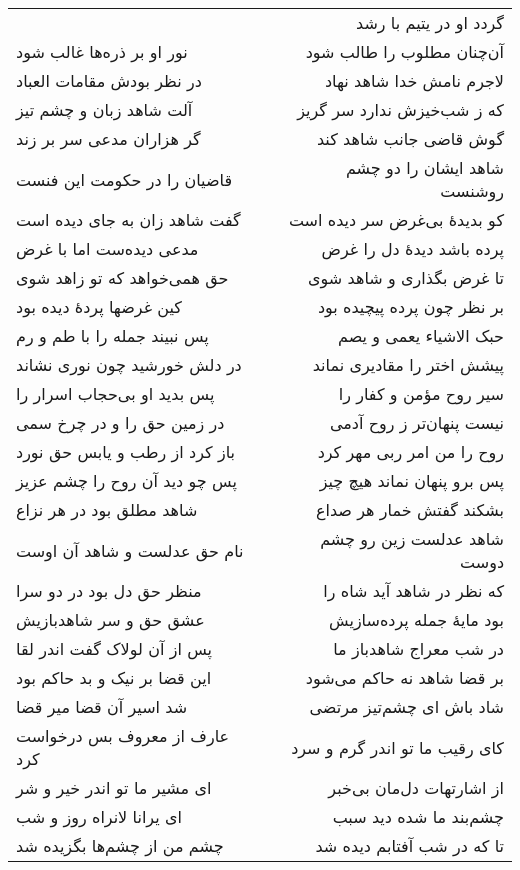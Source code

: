 \begin{center}
\begin{longtable}{l p{0.5cm} r}
&&
گردد او در یتیم با رشد
\\
نور او بر ذره‌ها غالب شود
&&
آن‌چنان مطلوب را طالب شود
\\
در نظر بودش مقامات العباد
&&
لاجرم نامش خدا شاهد نهاد
\\
آلت شاهد زبان و چشم تیز
&&
که ز شب‌خیزش ندارد سر گریز
\\
گر هزاران مدعی سر بر زند
&&
گوش قاضی جانب شاهد کند
\\
قاضیان را در حکومت این فنست
&&
شاهد ایشان را دو چشم روشنست
\\
گفت شاهد زان به جای دیده است
&&
کو بدیدهٔ بی‌غرض سر دیده است
\\
مدعی دیده‌ست اما با غرض
&&
پرده باشد دیدهٔ دل را غرض
\\
حق همی‌خواهد که تو زاهد شوی
&&
تا غرض بگذاری و شاهد شوی
\\
کین غرضها پردهٔ دیده بود
&&
بر نظر چون پرده پیچیده بود
\\
پس نبیند جمله را با طم و رم
&&
حبک الاشیاء یعمی و یصم
\\
در دلش خورشید چون نوری نشاند
&&
پیشش اختر را مقادیری نماند
\\
پس بدید او بی‌حجاب اسرار را
&&
سیر روح مؤمن و کفار را
\\
در زمین حق را و در چرخ سمی
&&
نیست پنهان‌تر ز روح آدمی
\\
باز کرد از رطب و یابس حق نورد
&&
روح را من امر ربی مهر کرد
\\
پس چو دید آن روح را چشم عزیز
&&
پس برو پنهان نماند هیچ چیز
\\
شاهد مطلق بود در هر نزاع
&&
بشکند گفتش خمار هر صداع
\\
نام حق عدلست و شاهد آن اوست
&&
شاهد عدلست زین رو چشم دوست
\\
منظر حق دل بود در دو سرا
&&
که نظر در شاهد آید شاه را
\\
عشق حق و سر شاهدبازیش
&&
بود مایهٔ جمله پرده‌سازیش
\\
پس از آن لولاک گفت اندر لقا
&&
در شب معراج شاهدباز ما
\\
این قضا بر نیک و بد حاکم بود
&&
بر قضا شاهد نه حاکم می‌شود
\\
شد اسیر آن قضا میر قضا
&&
شاد باش ای چشم‌تیز مرتضی
\\
عارف از معروف بس درخواست کرد
&&
کای رقیب ما تو اندر گرم و سرد
\\
ای مشیر ما تو اندر خیر و شر
&&
از اشارتهات دل‌مان بی‌خبر
\\
ای یرانا لانراه روز و شب
&&
چشم‌بند ما شده دید سبب
\\
چشم من از چشم‌ها بگزیده شد
&&
تا که در شب آفتابم دیده شد
\\

\end{longtable}
\end{center}
